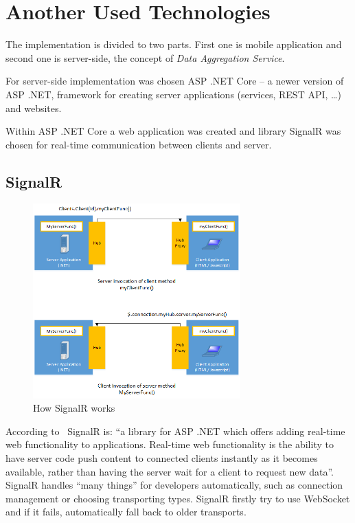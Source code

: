 \section{Another Used Technologies}
The implementation is divided to two parts. First one is mobile application and second one is server-side, the concept of \textit{Data Aggregation Service}. 

For server-side implementation was chosen ASP .NET Core -- a newer version of ASP .NET, framework for creating server applications  (services, REST API, \dots) and websites.

Within ASP .NET Core a web application was created and library SignalR was chosen for real-time communication between clients and server.
\subsection{SignalR}
\begin{figure}[ht!]
\centering
\includegraphics[width=8cm,keepaspectratio]{img/signal-r-overview}
\caption{How SignalR works \cite{signal-r-overview}}
\label{fig:signal-r-overview}
\end{figure}
According to~\cite{signal-r-overview} SignalR is: ``a library for ASP .NET which offers adding real-time web functionality to applications. Real-time web functionality is the ability to have server code push content to connected clients instantly as it becomes available, rather than having the server wait for a client to request new data''. SignalR handles ``many things'' for developers automatically, such as connection management or choosing transporting types. SignalR firstly try to use WebSocket and if it fails, automatically fall back to older transports.

